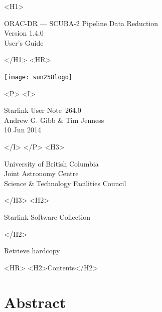 \documentclass[twoside,11pt]{article}
\newcommand{\stardoccategory}  {Starlink User Note}
\newcommand{\stardocsource}    {sun\stardocnumber}
\newcommand{\stardocnumber}    {264.0}
\newcommand{\stardocauthors}   {Andrew G. Gibb \& Tim Jenness}
\newcommand{\stardocdate}      {10 Jun 2014}
\newcommand{\stardoctitle}     {ORAC-DR --- SCUBA-2 Pipeline Data Reduction}
\newcommand{\stardocversion}   {Version 1.4.0}
\newcommand{\stardocmanual}    {User's Guide}
\newcommand{\htmladdnormallink}[2]{#1}
\newcommand{\htmladdimg}[1]{}
\newcommand{\htmlref}[2]{#1}
\newcommand{\htmladdtonavigation}[1]{}
\newcommand{\xlabel}[1]{}
\renewcommand{\_}{\texttt{\symbol{95}}}
\begin{document}
\begin{htmlonly}
   \xlabel{}
   \begin{rawhtml} <H1> \end{rawhtml}
      \stardoctitle\\
      \stardocversion\\
      \stardocmanual
   \begin{rawhtml} </H1> <HR> \end{rawhtml}

\texttt{[image: sun258\_logo]}

   \begin{rawhtml} <P> <I> \end{rawhtml}
   \stardoccategory\ \stardocnumber \\
   \stardocauthors \\
   \stardocdate
   \begin{rawhtml} </I> </P> <H3> \end{rawhtml}
      \htmladdnormallink{University of British Columbia}
                        {http://www.ubc.ca} \\
      \htmladdnormallink{Joint Astronomy Centre}
                        {http://www.jach.hawaii.edu}\\
      \htmladdnormallink{Science \& Technology Facilities Council}
                        {http://www.stfc.ac.uk} \\
   \begin{rawhtml} </H3> <H2> \end{rawhtml}
      \htmladdnormallink{Starlink Software Collection}{http://starlink.jach.hawaii.edu/}
   \begin{rawhtml} </H2> \end{rawhtml}
   \htmladdnormallink{\htmladdimg{source.gif} Retrieve hardcopy}
      {http://starlink.jach.hawaii.edu/cgi-bin/hcserver?\stardocsource}\\

  \label{stardoccontents}
  \begin{rawhtml}
    <HR>
    <H2>Contents</H2>
  \end{rawhtml}
  \htmladdtonavigation{\htmlref{\htmladdimg{contents_motif.gif}}
        {stardoccontents}}

  \section{\xlabel{abstract}Abstract}
\end{htmlonly}
\end{document}
